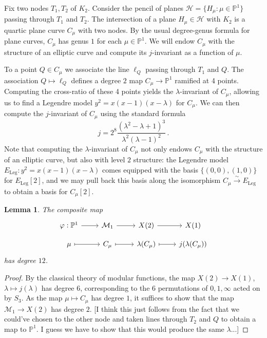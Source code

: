 \documentclass[reqno, 12pt]{amsart}
\newtheorem{lem}{Lemma}
\theoremstyle{definition}
\renewcommand{\P}{\mathbb P}
\newcommand{\sss}[1]{{\color{blue} [#1]}}
\begin{document}
Fix two nodes $T_1, T_2$ of $K_2$. Consider the pencil of planes $\mathcal{H} = \{H_\mu : \mu \in \P^1\}$ passing through $T_1$ and $T_2$. The intersection of a plane $H_\mu \in \mathcal{H}$ with $K_2$ is a quartic plane curve $C_\mu$ with two nodes. By the usual degree-genus formula for plane curves, $C_\mu$ has genus $1$ for each $\mu \in \P^1$. We will endow $C_\mu$ with the structure of an elliptic curve and compute its $j$-invariant as a function of $\mu$.

To a point $Q \in C_\mu$ we associate the line $\ell_Q$ passing through $T_1$ and $Q$. The association $Q \mapsto \ell_Q$ defines a degree $2$ map $C_\mu \to \P^1$ ramified at 4 points. Computing the cross-ratio of these 4 points yields the $\lambda$-invariant of $C_\mu$, allowing us to find a Legendre model $y^2 = x(x-1)(x-\lambda)$ for $C_\mu$. We can then compute the $j$-invariant of $C_\mu$ using the standard formula
$$
j = 2^8 \frac{(\lambda^2 - \lambda + 1)^3}{\lambda^2 (\lambda-1)^2}  \, .
$$
Note that computing the $\lambda$-invariant of $C_\mu$ not only endows $C_\mu$ with the structure of an elliptic curve, but also with level $2$ structure: the Legendre model $E_\text{Leg}: y^2 = x(x-1)(x-\lambda)$ comes equipped with the basis $\{(0,0), (1,0)\}$ for $E_\text{Leg}[2]$, and we may pull back this basis along the isomorphism $C_\mu \overset{\sim}{\to} E_\text{Leg}$ to obtain a basis for $C_\mu[2]$.
\begin{lem}
The composite map
%
$$
\begin{tikzcd}[row sep = small]
\varphi: \P^1 \ar[]{r}{} & \mathcal{M}_1 \ar[]{r}{} & X(2) \ar[]{r}{} & X(1)\\ 
\mu \ar[mapsto]{r}{} & C_\mu \ar[mapsto]{r}{} & \lambda(C_\mu) \ar[mapsto]{r}{} & j(\lambda(C_\mu))
\end{tikzcd}
$$
has degree $12$.
\end{lem}

\begin{proof}
By the classical theory of modular functions, the map $X(2) \to X(1)$, $\lambda \mapsto j(\lambda)$ has degree $6$, corresponding to the $6$ permutations of $0, 1, \infty$ acted on by $S_3$. As the map $\mu \mapsto C_\mu$ has degree $1$, it suffices to show that the map $\mathcal{M}_1 \to X(2)$ has degree $2$. \sss{I think this just follows from the fact that we could've chosen to the other node and taken lines through $T_2$ and $Q$ to obtain a map to $\P^1$. I guess we have to show that this would produce the same $\lambda$...}
\end{proof}
\end{document}

